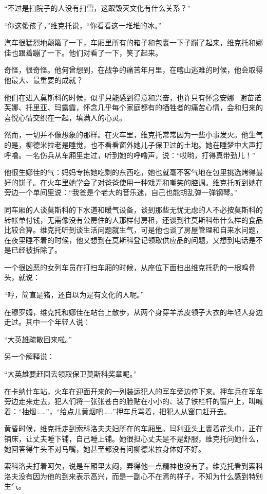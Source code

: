 “不过是扫院子的人没有扫雪，这跟毁灭文化有什么关系？”

“你这傻孩子，”维克托说，“你看看这一堆堆的冰。”

汽车很猛烈地颠簸了一下，车厢里所有的箱子和包裹一下子蹦了起来，维克托和娜佳也跟着蹦了一下。他们对看了一下，笑了起来。

奇怪，很奇怪。他何曾想到，在战争的痛苦年月里，在喀山逃难的时候，他会取得他最大、最重要的成就？

他们在进入莫斯科的时候，似乎只能感到得意和兴奋，也许只有怀念安娜·谢苗诺芙娜、托里亚、玛露霞，怀念几乎每个家庭都有的牺牲者的痛苦心情，会和归来的喜悦心情交织在一起，填满人的心灵。

然而，一切并不像想象的那样。在火车里，维克托常常因为一些小事发火。他生气的是，柳德米拉老是睡觉，也不看看窗外她儿子保卫过的土地。她在睡梦中大声打呼噜。一名伤兵从车厢里走过，听到她的呼噜声，说：“哎哟，打得真带劲儿！”

他很生娜佳的气：妈妈专拣她吃剩的东西吃，她也就毫不客气地在包里挑选烤得最好的饼子。在火车里她学会了对爸爸使用一种戏弄和嘲笑的腔调。维克托听到她在旁边一个单间里说：“我爸是个老大的音乐迷，自己也能胡乱弹一弹钢琴。”

同车厢的人谈莫斯科的下水道和暖气设备，谈到那些无忧无虑的人不必按莫斯科的转帐单付钱，无需像没有公房住的人那样付房租，还谈到往莫斯科带什么样的食品比较合算。维克托听到谈生活问题就生气，可是他也谈了房屋管理和自来水问题，在夜里睡不着的时候，他又想到在莫斯科登记领取供应品的问题，又想到电话是不是已经被拆除了。

一个很凶恶的女列车员在打扫车厢的时候，从座位下面扫出维克托扔的一根鸡骨头，就说：

“哼，简直是猪，还自以为是有文化的人呢。”

在穆罗姆，维克托和娜佳在站台上散步，从两个身穿羊羔皮领子大衣的年轻人身边走过。其中一个年轻人说：

“大英雄疏散回来啦。”

另一个解释说：

“大英雄要赶回去领取保卫莫斯科奖章呢。”

在卡纳什车站，火车在迎面开来的一列装运犯人的军车旁边停下来。押车兵在军车旁边走来走去，犯人们将一张张苍白的脸贴在小小的、装了铁栏杆的窗户上，叫喊着：“抽烟……”，“给点儿黄烟吧……”押车兵骂着，把犯人从窗口赶开去。

黄昏时候，维克托走到索科洛夫夫妇所在的车厢里。玛利亚头上裹着花头巾，正在铺床，让丈夫睡下铺，自己睡上铺。她很担心丈夫是不是舒服，维克托问她什么，她回答得牛头不对马嘴，她甚至都没有问柳德米拉身体好不好。

索科洛夫打着呵欠，说是车厢里太闷，弄得他一点精神也没有了。维克托看到索科洛夫没有因为他的到来表示高兴，而是一副心不在焉的样子，不知为什么感到特别生气。

